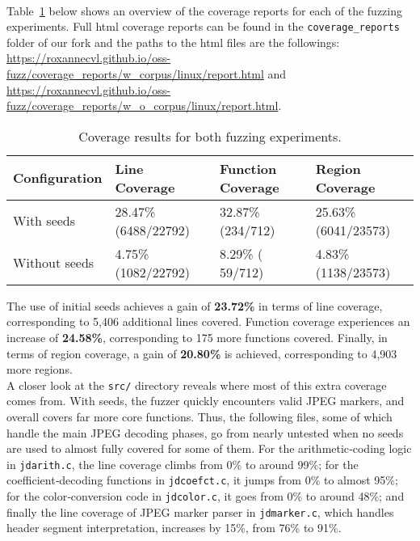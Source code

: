 \documentclass[12pt]{article}
\begin{document}
\noindent \\Table~\ref{tab:coverage} below shows an overview of the coverage reports for each of the fuzzing experiments. Full html coverage reports can be found in the \texttt{coverage\_reports} folder of our fork and the paths to the html files are the followings: \url{https://roxannecvl.github.io/oss-fuzz/coverage_reports/w_corpus/linux/report.html} and \url{https://roxannecvl.github.io/oss-fuzz/coverage_reports/w_o_corpus/linux/report.html}.

\begin{table}[ht]
  \centering
  \caption{Coverage results for both fuzzing experiments.}
  \label{tab:coverage}
  \begin{tabular}{|l l l l|}
    \hline
    Configuration  & Line Coverage           & Function Coverage        & Region Coverage         \\ \hline
    With seeds     & 28.47\% (6488/22792)    & 32.87\% (234/712)        & 25.63\% (6041/23573)    \\
    Without seeds  &  4.75\% (1082/22792)    &  8.29\% ( 59/712)        &  4.83\% (1138/23573)    \\ \hline
  \end{tabular}
\end{table}

\noindent The use of initial seeds achieves a gain of \textbf{23.72\%} in terms of line coverage, corresponding to 5,406 additional lines covered. Function coverage experiences an increase of \textbf{24.58\%}, corresponding to 175 more functions covered. Finally, in terms of region coverage, a gain of \textbf{20.80\%} is achieved, corresponding to 4,903 more regions.\\

\noindent A closer look at the \texttt{src/} directory reveals where most of this extra coverage comes from.  With seeds, the fuzzer quickly encounters valid JPEG markers, and overall covers far more core functions. Thus, the following files, some of which handle the main JPEG decoding phases, go from nearly untested when no seeds are used to almost fully covered for some of them. For the arithmetic‐coding logic in \texttt{jdarith.c}, the line coverage climbs from 0\% to around 99\%; for the coefficient‐decoding functions in \texttt{jdcoefct.c}, it jumps from 0\% to almost 95\%; for the color‐conversion code in \texttt{jdcolor.c}, it goes from 0\% to around 48\%; and finally the line coverage of JPEG marker parser in \texttt{jdmarker.c}, which handles header segment interpretation, increases by 15\%, from 76\% to 91\%. 
\end{document}
